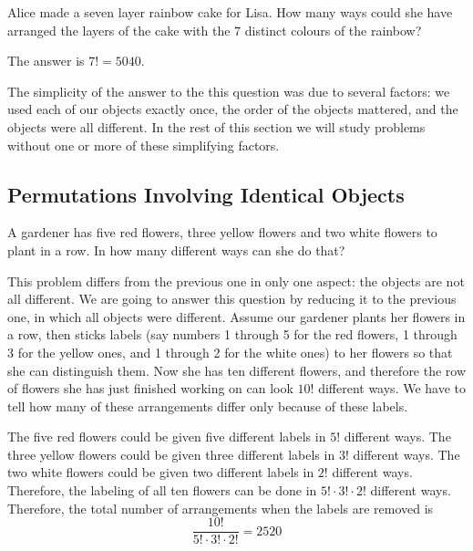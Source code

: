 \documentclass[11pt,a4paper]{book}
\begin{document}
\begin{example}

Alice made a seven layer rainbow cake for Lisa. How many ways could
she have arranged the layers of the cake with the $7$ distinct colours
of the rainbow?

\Solution

The answer is $7!=5040$.

\end{example}

The simplicity of the answer to the this question was due to several
factors: we used each of our objects exactly once, the order of the
objects mattered, and the objects were all different. In the rest
of this section we will study problems without one or more of these
simplifying factors.

\subsection{Permutations Involving Identical Objects}

\begin{example}

A gardener has five red flowers, three yellow flowers and two white
flowers to plant in a row. In how many different ways can she do that?

\Solution

This problem differs from the previous one in only one aspect: the
objects are not all different. We are going to answer this question
by reducing it to the previous one, in which all objects were different.
Assume our gardener plants her flowers in a row, then sticks labels
(say numbers 1 through 5 for the red flowers, 1 through 3 for the
yellow ones, and 1 through 2 for the white ones) to her flowers so
that she can distinguish them. Now she has ten different flowers,
and therefore the row of flowers she has just finished working on
can look $10!$ different ways. We have to tell how many of these
arrangements differ only because of these labels.

The five red flowers could be given five different labels in $5!$
different ways. The three yellow flowers could be given three different
labels in $3!$ different ways. The two white flowers could be given
two different labels in $2!$ different ways. Therefore, the labeling
of all ten flowers can be done in $5!\cdot3!\cdot2!$ different ways.
Therefore, the total number of arrangements when the labels are removed
is
\[
\frac{10!}{5!\cdot3!\cdot2!}=2520
\]

\end{example}
\end{document}
